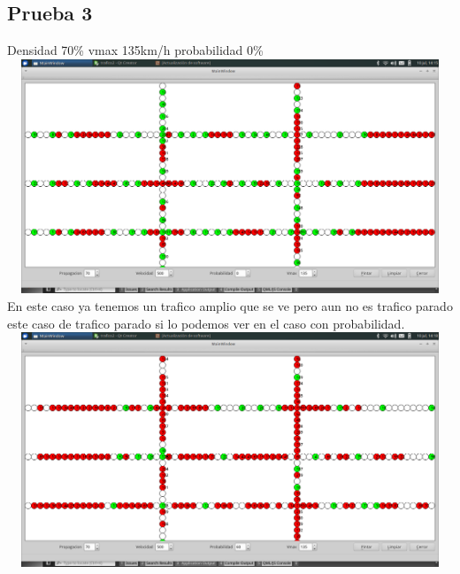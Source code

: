 \documentclass[a4paper,10pt]{article}
\begin{document}
\subsection{Prueba 3}
Densidad 70\% vmax 135km/h probabilidad 0\%
\\
\includegraphics[width=15cm, height=7cm]{36}
\\
En este caso ya tenemos un trafico amplio que se ve pero aun no es trafico parado este caso de trafico parado si lo podemos ver en el caso con probabilidad.
\\
\includegraphics[width=15cm, height=7cm]{37}
\\
\end{document}
